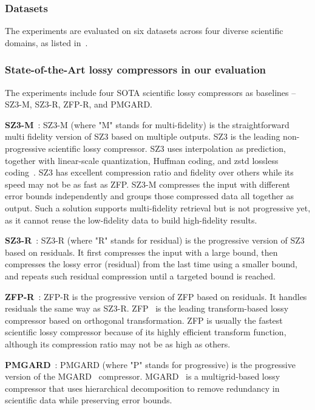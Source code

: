 \subsubsection{Datasets} The experiments are evaluated on six datasets across four diverse scientific domains, as listed in~.

\subsubsection{State-of-the-Art lossy compressors in our evaluation}
\label{sec: exp-baseline}
The experiments include four SOTA scientific lossy compressors as baselines -- SZ3-M, SZ3-R, ZFP-R, and PMGARD. 

\noindent\textbf{SZ3-M}~\cite{pmgard-qoi}: SZ3-M (where "M" stands for multi-fidelity) is the straightforward multi fidelity version of SZ3 based on multiple outputs. SZ3 is the leading non-progressive scientific lossy compressor. SZ3 uses interpolation as prediction, together with linear-scale quantization, Huffman coding, and zstd lossless coding~\cite{rfc8478}. SZ3 has excellent compression ratio and fidelity over others while its speed may not be as fast as ZFP.  SZ3-M compresses the input with different error bounds independently and groups those compressed data all together as output. Such a solution supports multi-fidelity retrieval but is not progressive yet, as it cannot reuse the low-fidelity data to build high-fidelity results. 

\noindent\textbf{SZ3-R}~\cite{pmgard-qoi, peter-tvcg24-pframework}: SZ3-R (where "R" stands for residual) is the progressive version of SZ3 based on residuals. It first compresses the input with a large bound, then compresses the lossy error (residual) from the last time using a smaller bound, and repeats such residual compression until a targeted bound is reached. 

\noindent\textbf{ZFP-R}~\cite{peter-tvcg24-pframework}: ZFP-R is the progressive version of ZFP based on residuals. It handles residuals the same way as SZ3-R. ZFP~\cite{zfp} is the leading transform-based lossy compressor based on orthogonal transformation. ZFP is usually the fastest scientific lossy compressor because of its highly efficient transform function, although its compression ratio may not be as high as others.

\noindent\textbf{PMGARD}~\cite{pmgard, pmgard-qoi}: PMGARD (where "P" stands for progressive) is the progressive version of the MGARD~\cite{pmgard} compressor. MGARD~\cite{mgard, mgardx} is a multigrid-based lossy compressor that uses hierarchical decomposition to remove redundancy in scientific data while preserving error bounds.

